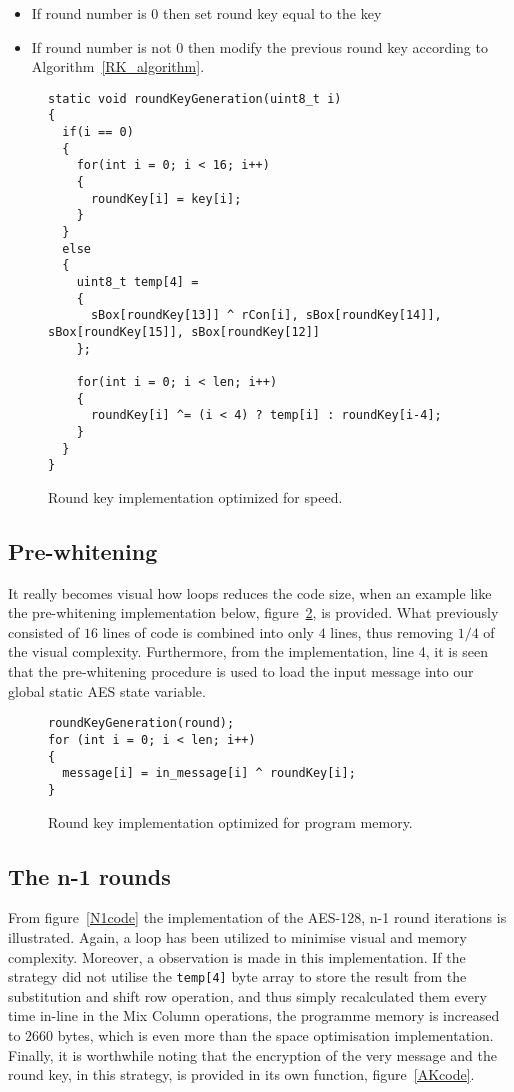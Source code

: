 \documentclass[Report.tex]{subfiles}
\begin{document}
\begin{itemize}
\item[1] If round number is $0$ then set round key equal to the key
\item[2] If round number is not $0$ then modify the previous round key according to Algorithm~\ref{RK_algorithm}.
\end{itemize}

\begin{figure}[h]
\begin{lstlisting}[basicstyle=\tiny]
static void roundKeyGeneration(uint8_t i)
{
  if(i == 0)
  {
    for(int i = 0; i < 16; i++)
    {
      roundKey[i] = key[i];
    }
  }
  else
  {
    uint8_t temp[4] =
    {
      sBox[roundKey[13]] ^ rCon[i], sBox[roundKey[14]], sBox[roundKey[15]], sBox[roundKey[12]]
    };
    
    for(int i = 0; i < len; i++)
    {
      roundKey[i] ^= (i < 4) ? temp[i] : roundKey[i-4];
    }
  }
}
\end{lstlisting}
\caption{\label{RKcode} Round key implementation optimized for speed.}
\end{figure}

\subsection{Pre-whitening}
It really becomes visual how loops reduces
the code size, when an example like the pre-whitening implementation below, figure~\ref{PWcode},
is provided. What previously consisted of $16$ lines of code is combined
into only $4$ lines, thus removing $1/4$ of the visual complexity.
Furthermore, from the implementation, line 4, it is 
seen that the pre-whitening procedure is used to load
the input message into our global static AES state variable.  

\begin{figure}[h]
\begin{lstlisting}[basicstyle=\tiny]
roundKeyGeneration(round);
for (int i = 0; i < len; i++)
{
  message[i] = in_message[i] ^ roundKey[i];
}
\end{lstlisting}
\caption{\label{PWcode} Round key implementation optimized for program memory.}
\end{figure}

\subsection{The n-1 rounds}
From figure~\ref{N1code} the implementation of the AES-128,
n-1 round iterations is illustrated. Again, a loop has been 
utilized to minimise visual and memory complexity. Moreover,
a observation is made in this implementation. 
If the strategy did not utilise the \verb+temp[4]+ byte array to store the
result from the substitution and shift row operation, and thus simply
recalculated them every time in-line in the Mix Column operations,
the programme memory is increased to $2660$ bytes, which is even more
than the space optimisation implementation. Finally, it is worthwhile
noting that the encryption of the very message and the round key,
in this strategy, is provided in its own function, figure~\ref{AKcode}.
\end{document}
